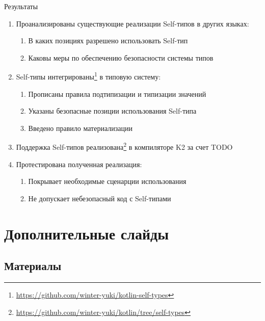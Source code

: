 \documentclass[handout,aspectratio=169,usenames,dvipsnames]{beamer}
\begin{document}
    \begin{frame}{Результаты}
        \begin{enumerate}
            \item Проанализированы существующие реализации Self-типов в других языках:
            \begin{enumerate}
                \item В каких позициях разрешено использовать Self-тип
                \item Каковы меры по обеспечению безопасности системы типов
            \end{enumerate}
            \item Self-типы интегрированы\footnote{\url{https://github.com/winter-yuki/kotlin-self-types}} в типовую систему:
            \begin{enumerate}
                \item Прописаны правила подтипизации и типизации значений
                \item Указаны безопасные позиции использования Self-типа
                \item Введено правило материализации
            \end{enumerate}
            \item Поддержка Self-типов реализована\footnote{\url{https://github.com/winter-yuki/kotlin/tree/self-types}} в компиляторе K2 за счет TODO %
            \item Протестирована полученная реализация:
            \begin{enumerate}
                \item Покрывает необходимые сценарции использования
                \item Не допускает небезопасный код с Self-типами
            \end{enumerate}
        \end{enumerate}
    \end{frame}


    \appendix


    \section{Дополнительные слайды}

    \subsection{Материалы}
\end{document}
